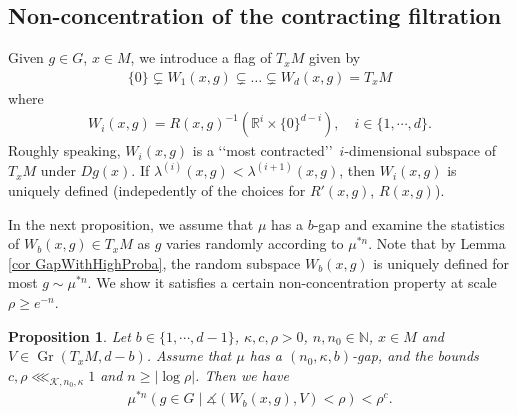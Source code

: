 \documentclass[11pt, leqno, fleqn]{amsart}
\newcommand{\margem}[1]{\marginpar{{\scriptsize {#1}}}}
\def\clo{   \color{orange}}
\def \R{{\mathbb R}}
\def \N{{\mathbb N}}
\DeclareMathOperator{\Gr}{Gr}
\newcommand{\cK}{{\mathcal K}}
\newcommand{\ary}{\begin{eqnarray}}
\newcommand{\eary}{\end{eqnarray}}
\newcommand{\aryst}{\begin{eqnarray*}}
\newcommand{\earyst}{\end{eqnarray*}}
\newtheorem{prop}[thm]{\bf Proposition}
\theoremstyle{definition}
\theoremstyle{definition}
\begin{document}
		 	
		\subsection{Non-concentration of the contracting filtration} \label{Sec-contrac-filt}

	
	Given $g\in G$, $x\in M$, we introduce a flag of $T_x M$ given by
			 \aryst
	\{0\}\subsetneq  W_{1}(x, g) \subsetneq \dots  \subsetneq W_{d}(x, g)= T_x M 	\earyst
	where
	\ary \label{eq Wixg}
	W_i(x, g) = R(x, g)^{-1}(\R^{i} \times \{0\}^{d-i}), \quad i \in \{1, \cdots, d\}.
	\eary
	Roughly speaking, $W_i(x, g)$ is a \lq\lq most contracted\rq\rq  \  $i$-dimensional subspace of $T_xM$ under $Dg(x)$. If $\lambda^{(i)}(x, g)<\lambda^{(i+1)}(x, g)$, then $W_i(x, g)$  is uniquely defined (indepedently of the choices for $R'(x, g)$, $R(x, g)$). 
	
In the next proposition, we assume that $\mu$ has a $b$-gap and examine the statistics of $W_{b}(x,g)\in T_{x}M$
as $g$ varies randomly according to $\mu^{*n}$. Note that by Lemma \ref{cor GapWithHighProba}, the random subspace $W_{b}(x,g)$ is uniquely defined for most $g\sim \mu^{*n}$. We show it satisfies a certain non-concentration property at scale $\rho\geq e^{-n}$.

 	
		 \begin{prop} \label{lem AllGapsImpliesNonConcentration}    		 
		 Let $b \in \{1, \cdots, d-1\}$,  $\kappa, c, \rho>0$, $n, n_{0}\in \N$, $x \in M$ and  $V \in \Gr(T_x M, d-b)$. Assume that $\mu$ has a $(n_{0}, \kappa, b)$-gap, and the bounds  $c, \rho \lll_{\cK, n_{0}, \kappa} 1$ and $n \geq | \log \rho |$.
		 	   Then we have 
		 	\aryst
		 	\mu^{*n}(  g \in G \mid  \measuredangle( W_b(x, g), V) < \rho  ) < \rho^{c}.
		 	\earyst
		 \end{prop}
		  
 
	
\end{document}
